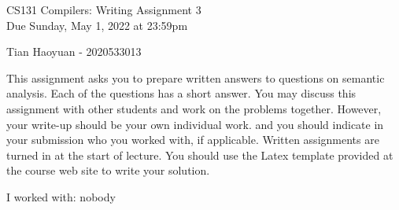 \documentclass[10pt]{article}
\begin{document}
\begin{center}
    \Large CS131 Compilers: Writing Assignment 3\\
    Due Sunday, May 1, 2022 at 23:59pm
\end{center}

\begin{center}
    \LARGE Tian Haoyuan - 2020533013
\end{center}

This assignment asks you to prepare written answers to questions on
semantic analysis. Each of the questions has a short answer. You
may discuss this assignment with other students and work on the problems
together. However, your write-up should be your own individual work.
and you should indicate in your submission who you worked with, if applicable.
Written assignments are turned in at the start of lecture.
You should use the Latex template provided at the course web site to write your solution.

\begin{center}
    I worked with: nobody
\end{center}
\end{document}
